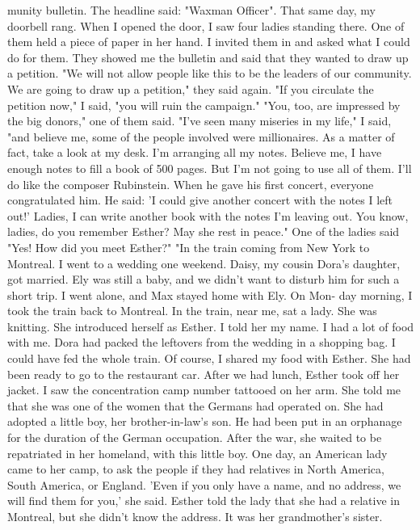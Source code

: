 munity bulletin.
The headline said: "Waxman Officer".
That same day, my doorbell rang.
When I opened the door, I saw 
four ladies standing there.
One of them held a piece of paper in her 
hand.
I invited them in and asked what I could do for them.
They 
showed me the bulletin and said that they wanted to draw up a petition.
"We will not allow people like this to be the leaders of our 
community.
We are going to draw up a petition," they said again.
"If you circulate the petition now," I said, "you will ruin the 
campaign."
"You, too, are impressed by the big donors," one of them said.
"I've seen many miseries in my life," I said, "and believe me, 
some of the people involved were millionaires.
As a matter of fact, 
take a look at my desk.
I'm arranging all my notes.
Believe me, I 
have enough notes to fill a book of 500 pages.
But I'm not going to 
use all of them.
I'll do like the composer Rubinstein.
When he 
gave his first concert, everyone congratulated him.
He said: 'I 
could give another concert with the notes I left out!'
Ladies, I can 
write another book with the notes I'm leaving out.
You know, ladies, 
do you remember Esther?
May she rest in peace."
One of the ladies said "Yes!
How did you meet Esther?"
"In the train coming from New York to Montreal.
I went to a 
wedding one weekend.
Daisy, my cousin Dora's daughter, got married.
Ely was still a baby, and we didn't want to disturb him for such 
a short trip.
I went alone, and Max stayed home with Ely.
On Mon-
day morning, I took the train back to Montreal.
In the train, near 
me, sat a lady.
She was knitting.
She introduced herself as Esther.
I told her my name.
I had 
a lot of food with me.
Dora had packed the leftovers from the wedding in a shopping bag.
I could have fed the whole train.
Of 
course, I shared my food with Esther.
She had been ready to 
go to the restaurant car.
After we had lunch, Esther took off her 
jacket.
I saw the concentration camp number tattooed on her arm.
She told me that she was one of the women that the Germans had operated on.
She had adopted a little boy, her brother-in-law's son.
He had
been put in an orphanage for the duration of the German occupation.
After the war, she waited to be repatriated in her homeland, with 
this little boy.
One day, an American lady came to her camp, to 
ask the people if they had relatives in North America, South America, 
or England.
'Even if you only have a name, and no address, we will 
find them for you,' she said.
Esther told the lady that she had a 
relative in Montreal, but she didn't know the address.
It was her 
grandmother's sister.
